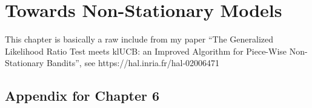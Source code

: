 

\chapter{Towards Non-Stationary Models}
\label{chapter:6}
\minitoc
\newpage
\graphicspath{{2-Chapters/6-Chapter/Images/}}

This chapter is basically a raw include from my paper ``The Generalized Likelihood Ratio Test meets klUCB: an Improved Algorithm for Piece-Wise Non-Stationary Bandits'', see https://hal.inria.fr/hal-02006471









\section{Appendix for Chapter 6}
\label{sec:6:appendix}


